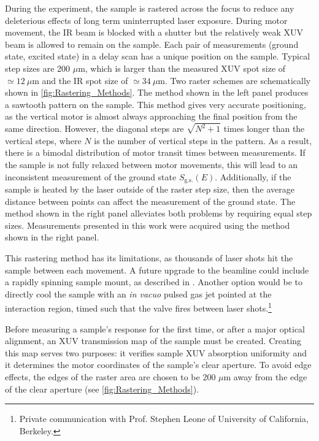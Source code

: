 During the experiment, the sample is rastered across the focus to reduce any deleterious effects of long term uninterrupted laser exposure. During motor movement, the IR beam is blocked with a shutter but the relatively weak XUV beam is allowed to remain on the sample. Each pair of measurements (ground state, excited state) in a delay scan has a unique position on the sample. Typical step sizes are 200 $\mu$m, which is larger than the measured XUV spot size of $\simeq 12 \ \mu \textrm{m}$ and the IR spot size of $\simeq 34 \ \mu \textrm{m}$. Two raster schemes are schematically shown in \cref{fig:Rastering_Methods}. The method shown in the left panel produces a sawtooth pattern on the sample. This method gives very accurate positioning, as the vertical motor is almost always approaching the final position from the same direction. However, the diagonal steps are $\sqrt{N^2 + 1}$ times longer than the vertical steps, where $N$ is the number of vertical steps in the pattern. As a result, there is a bimodal distribution of motor transit times between measurements. If the sample is not fully relaxed between motor movements, this will lead to an inconsistent measurement of the ground state $S_{\textrm{g.s.}}(E)$. Additionally, if the sample is heated by the laser outside of the raster step size, then the average distance between points can affect the measurement of the ground state. The method shown in the right panel alleviates both problems by requiring equal step sizes. Measurements presented in this work were acquired using the method shown in the right panel.

This rastering method has its limitations, as thousands of laser shots hit the sample between each movement. A future upgrade to the beamline could include a rapidly spinning sample mount, as described in \cite{jagerAttosecondTransientAbsorption2018}. Another option would be to directly cool the sample with an \textit{in vacuo} pulsed gas jet pointed at the interaction region, timed such that the valve fires between laser shots.\footnote{Private communication with Prof. Stephen Leone of University of California, Berkeley.}

Before measuring a sample's response for the first time, or after a major optical alignment, an XUV transmission map of the sample must be created. Creating this map serves two purposes: it verifies sample XUV absorption uniformity and it determines the motor coordinates of the sample's clear aperture. To avoid edge effects, the edges of the raster area are chosen to be 200 $\mu$m away from the edge of the clear aperture (see \cref{fig:Rastering_Methods}).

